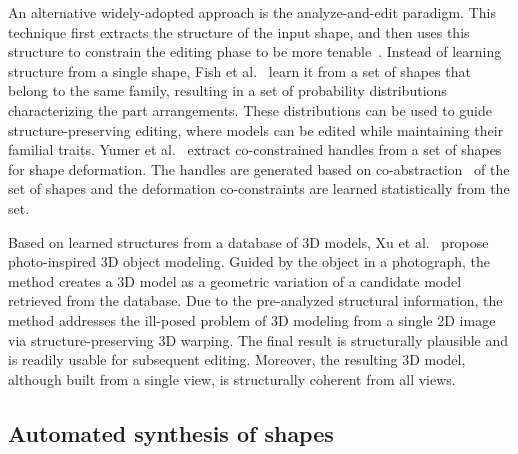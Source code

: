 An alternative widely-adopted approach is the analyze-and-edit paradigm.  This technique first extracts the structure of the input shape, and then uses this structure to constrain the editing phase to be more tenable~\cite{Gal:2009:IAA}.
Instead of learning structure from a single shape, Fish et al.~\cite{Fish:2014:MR} learn it from a set of shapes that belong to the same family, resulting in a set of probability distributions characterizing the part arrangements. These distributions can be used to guide structure-preserving editing, where models can be
edited while maintaining their familial traits.
Yumer et al.~\cite{Yumer:2014:CCH} extract co-constrained handles from a set of shapes for shape deformation.
The handles are generated based on co-abstraction~\cite{Yumer:2012:CSC} of the set of shapes and the deformation co-constraints are learned statistically from the set.  

Based on learned structures from a database of 3D models, Xu et al.~\cite{Xu:2011:PMO} propose photo-inspired 3D object modeling.
Guided by the object in a photograph, the method creates a 3D model as a geometric variation of a candidate model retrieved from the database.
Due to the pre-analyzed structural information, the method addresses the ill-posed problem of 3D modeling from a single 2D image
via structure-preserving 3D warping. The final result is structurally plausible and is readily usable for subsequent editing.
Moreover, the resulting 3D model, although built from a single view, is structurally coherent from all views.

\subsection{Automated synthesis of shapes}
\label{sec:synthesis}



